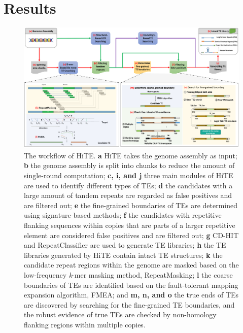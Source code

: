\documentclass{bmcart}
\begin{document}
\section*{Results}
\begin{figure}[h!]
	\centerline{\includegraphics[width=1.0\textwidth]{figures/Framework1.pdf}}
	\caption{The workflow of HiTE. \textbf{a} HiTE takes the genome assembly as input; \textbf{b} the genome assembly is split into chunks to reduce the amount of single-round computation; \textbf{c, i, and j} three main modules of HiTE are used to identify different types of TEs; \textbf{d} the candidates with a large amount of tandem repeats are regarded as false positives and are filtered out; \textbf{e} the fine-grained boundaries of TEs are determined using signature-based methods; \textbf{f} the candidates with repetitive flanking sequences within copies that are parts of a larger repetitive element are considered false positives and are filtered out; \textbf{g} CD-HIT and RepeatClassifier are used to generate TE libraries; \textbf{h} the TE libraries generated by HiTE contain intact TE structures; \textbf{k} the candidate repeat regions within the genome are masked based on the low-frequency \emph{k}-mer masking method, RepeatMasking; \textbf{l} the coarse boundaries of TEs are identified based on the fault-tolerant mapping expansion algorithm, FMEA; and \textbf{m, n, and o} the true ends of TEs are discovered by searching for the fine-grained TE boundaries, and the robust evidence of true TEs are checked by non-homology flanking regions within multiple copies.}
	\label{fig:framework}
\end{figure}
\end{document}
